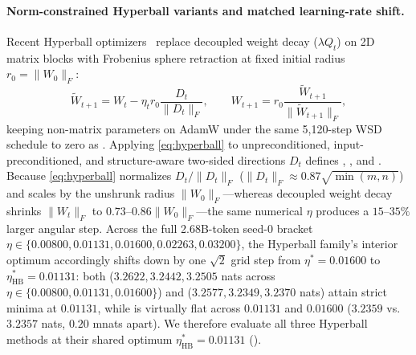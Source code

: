 \paragraph{Norm-constrained Hyperball variants and matched learning-rate shift.}
Recent Hyperball optimizers~\citep{wen2026hyperball} replace decoupled weight decay ($\lambda Q_t$) on 2D matrix blocks with Frobenius sphere retraction at fixed initial radius $r_0=\|W_0\|_F$:
\begin{equation}
 \widetilde W_{t+1}=W_t-\eta_t r_0\frac{D_t}{\|D_t\|_F},\qquad
 W_{t+1}=r_0\frac{\widetilde W_{t+1}}{\|\widetilde W_{t+1}\|_F},
 \label{eq:hyperball}
\end{equation}
keeping non-matrix parameters on AdamW under the same 5,120-step WSD schedule to zero as . Applying \cref{eq:hyperball} to unpreconditioned, input-preconditioned, and structure-aware two-sided directions $D_t$ defines , , and . Because \cref{eq:hyperball} normalizes $D_t/\|D_t\|_F$ ($\|D_t\|_F\approx0.87\sqrt{\min(m,n)}$) and scales by the unshrunk radius $\|W_0\|_F$---whereas decoupled weight decay shrinks $\|W_t\|_F$ to $0.73\text{--}0.86\|W_0\|_F$---the same numerical $\eta$ produces a $15\text{--}35\%$ larger angular step. Across the full 2.68B-token seed-0 bracket $\eta\in\{0.00800,0.01131,0.01600,0.02263,0.03200\}$, the Hyperball family's interior optimum accordingly shifts down by one $\sqrt{2}$ grid step from $\eta^*=0.01600$ to $\eta^*_{\mathrm{HB}}=0.01131$: both  ($3.2622,3.2442,3.2505$ nats across $\eta\in\{0.00800,0.01131,0.01600\}$) and  ($3.2577,3.2349,3.2370$ nats) attain strict minima at $0.01131$, while  is virtually flat across $0.01131$ and $0.01600$ ($3.2359$ vs.\ $3.2357$ nats, $0.20$ mnats apart). We therefore evaluate all three Hyperball methods at their shared optimum $\eta^*_{\mathrm{HB}}=0.01131$ ().



